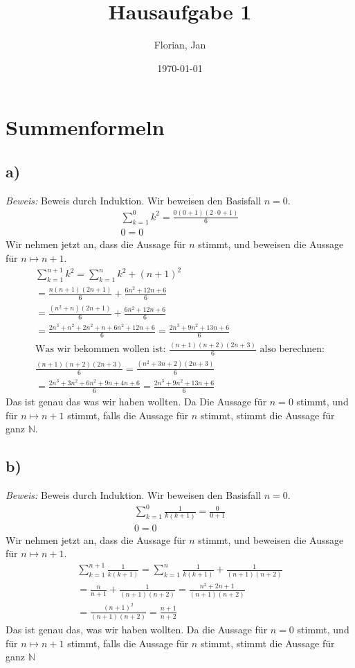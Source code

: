 \documentclass[]{scrartcl}
\title{Hausaufgabe 1}
\author{Florian, Jan}
\date{\today}
\begin{document}
\maketitle
\newpage
\tableofcontents
\newpage

\section{Summenformeln}

\subsection{a)}

\textit{Beweis:} Beweis durch Induktion. Wir beweisen den Basisfall $n=0$.
\begin{gather}
	\sum_{k=1}^0 k^2 = \frac{0(0+1)(2\cdot0+1)}{6}\\
	0 = 0
\end{gather}
Wir nehmen jetzt an, dass die Aussage für $n$ stimmt, und beweisen die Aussage für $n \mapsto n+1$.
\begin{gather}
	\sum_{k=1}^{n+1} k^2 = \sum_{k=1}^n k^2 + (n+1)^2\\
	= \frac{n(n+1)(2n+1)}{6} + \frac{6n^2 + 12n + 6}{6}\\
	= \frac{(n^2+n)(2n+1)}{6} + \frac{6n^2 + 12n + 6}{6}\\
	= \frac{2n^3 + n^2 + 2n^2 + n + 6n^2 + 12n + 6}{6} = \frac{2n^3 + 9n^2 + 13n + 6}{6}\\
	\text{Was wir bekommen wollen ist: } \frac{(n+1)(n+2)(2n+3)}{6} \text{ also berechnen:}\nonumber\\
	\frac{(n+1)(n+2)(2n+3)}{6} = \frac{(n^2 + 3n + 2)(2n+3)}{6}\\
	= \frac{2n^3 + 3n^2 + 6n^2 + 9n + 4n + 6}{6} = \frac{2n^3 + 9n^2 +13n + 6}{6}
\end{gather}
Das ist genau das was wir haben wollten. Da Die Aussage für $n = 0$ stimmt, und für $n\mapsto n+1$ stimmt, falls die Aussage für $n$ stimmt, stimmt die Aussage für ganz $\mathbb{N}$.

\subsection{b)}
\textit{Beweis: } Beweis durch Induktion. Wir beweisen den Basisfall $n = 0$.
\begin{gather}
	\sum_{k=1}^0 \frac{1}{k(k+1)} = \frac{0}{0 + 1}\\
	0 = 0
\end{gather}
Wir nehmen jetzt an, dass die Aussage für $n$ stimmt, und beweisen die Aussage für $n\mapsto n+1$.
\begin{gather}
	\sum_{k=1}^{n+1} \frac{1}{k(k+1)} = \sum_{k=1}^n \frac{1}{k(k+1)} + \frac{1}{(n+1)(n+2)}\\
	= \frac{n}{n+1} + \frac{1}{(n+1)(n+2)} = \frac{n^2 + 2n + 1}{(n+1)(n+2)}\\
	= \frac{(n+1)^2}{(n+1)(n+2)} = \frac{n+1}{n+2}
\end{gather}
Das ist genau das, was wir haben wollten. Da die Aussage für $n=0$ stimmt, und für $n\mapsto n+1$ stimmt, falls die Aussage für $n$ stimmt, stimmt die Aussage für ganz $\mathbb{N}$
\end{document}
